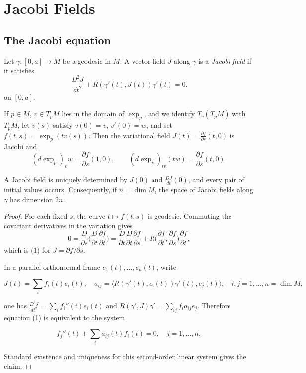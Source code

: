 \chapter{Jacobi Fields}
\label{chap:dc-jacobi-fields}

\section{The Jacobi equation}

\begin{definition}
  \label{def:dc-ch5-2-1}
  \leanok
  Let $\gamma:[0,a]\to M$ be a geodesic in $M$. A vector field $J$ along $\gamma$ is
  a \emph{Jacobi field} if it satisfies
  $$
  \frac{D^2 J}{dt^2}+R(\gamma'(t),J(t))\gamma'(t)=0.\tag{1}
  $$
  on $[0,a]$.

  If $p\in M$, $v\in T_pM$ lies in the domain of $\exp_p$, and we identify
  $T_v(T_pM)$ with $T_pM$, let $v(s)$ satisfy $v(0)=v$, $v'(0)=w$, and set
  $f(t,s)=\exp_p(tv(s))$. Then the variational field
  $J(t)=\frac{\partial f}{\partial s}(t,0)$ is Jacobi and
  $$
  (d\exp_p)_v w=\frac{\partial f}{\partial s}(1,0),\qquad
  (d\exp_p)_{tv}(tw)=\frac{\partial f}{\partial s}(t,0).
  $$

  A Jacobi field is uniquely determined by $J(0)$ and $\frac{DJ}{dt}(0)$, and
  every pair of initial values occurs. Consequently, if $n=\dim M$, the space
  of Jacobi fields along $\gamma$ has dimension $2n$.
\end{definition}
\begin{proof}
  \sketch
  For each fixed $s$, the curve $t\mapsto f(t,s)$ is geodesic. Commuting the
  covariant derivatives in the variation gives
  $$
  0=\frac{D}{\partial s}\Big(\frac{D}{\partial t}\frac{\partial f}{\partial t}\Big)
  =\frac{D}{\partial t}\frac{D}{\partial t}\frac{\partial f}{\partial s}
  +R\Big(\frac{\partial f}{\partial t},\frac{\partial f}{\partial s}\Big)
    \frac{\partial f}{\partial t},
  $$
  which is (1) for $J=\partial f/\partial s$.

  In a parallel orthonormal frame $e_1(t),\dots,e_n(t)$, write
  
  $$
  J(t)=\sum_i f_i(t)e_i(t),\quad a_{ij}=\langle R(\gamma'(t),e_i(t))\gamma'(t),e_j(t)\rangle,\quad i,j=1,\dots,n=\dim M,
  $$
  
  one has $\frac{D^2 J}{dt^2}=\sum_i f_i''(t)e_i(t)$ and
  $R(\gamma',J)\gamma'=\sum_{ij}f_i a_{ij}e_j$. Therefore equation (1) is equivalent
  to the system
  
  $$
  f_j''(t)+\sum_i a_{ij}(t)f_i(t)=0,\quad j=1,\dots,n,
  $$
  
  Standard existence and uniqueness for this second-order linear system gives
  the claim.
\end{proof}

